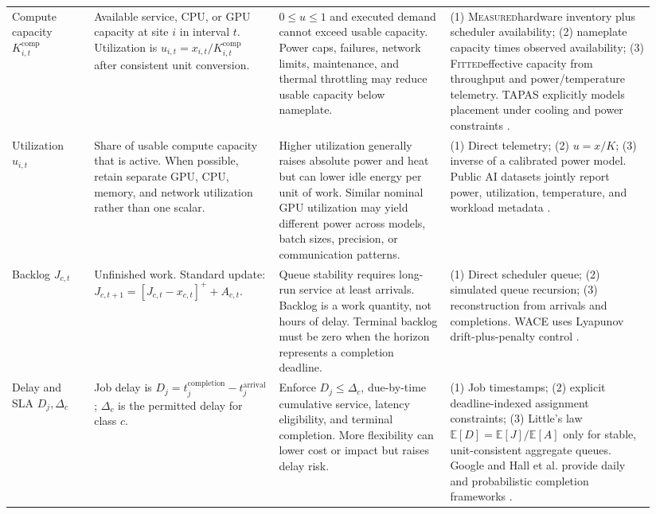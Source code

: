 \documentclass[10pt]{article}
\newcommand{\status}[1]{\textsc{#1}}
\newcommand{\Measured}{\status{Measured}}
\newcommand{\Fitted}{\status{Fitted}}
\begin{document}
\begin{landscape}
\begin{longtable}{@{}P{0.12\linewidth}P{0.27\linewidth}P{0.25\linewidth}P{0.30\linewidth}@{}}
Compute capacity $K^{\mathrm{comp}}_{i,t}$ & Available service, CPU, or GPU capacity at site $i$ in interval $t$. Utilization is $u_{i,t}=x_{i,t}/K^{\mathrm{comp}}_{i,t}$ after consistent unit conversion. & $0\le u\le1$ and executed demand cannot exceed usable capacity. Power caps, failures, network limits, maintenance, and thermal throttling may reduce usable capacity below nameplate. & (1) \Measured hardware inventory plus scheduler availability; (2) nameplate capacity times observed availability; (3) \Fitted effective capacity from throughput and power/temperature telemetry. TAPAS explicitly models placement under cooling and power constraints \cite{stojkovic2025tapas}. \\

Utilization $u_{i,t}$ & Share of usable compute capacity that is active. When possible, retain separate GPU, CPU, memory, and network utilization rather than one scalar. & Higher utilization generally raises absolute power and heat but can lower idle energy per unit of work. Similar nominal GPU utilization may yield different power across models, batch sizes, precision, or communication patterns. & (1) Direct telemetry; (2) $u=x/K$; (3) inverse of a calibrated power model. Public AI datasets jointly report power, utilization, temperature, and workload metadata \cite{nlr2026genai,elsayed2026ai}. \\

Backlog $J_{c,t}$ & Unfinished work. Standard update: $J_{c,t+1}=[J_{c,t}-x_{c,t}]^+ + A_{c,t}$. & Queue stability requires long-run service at least arrivals. Backlog is a work quantity, not hours of delay. Terminal backlog must be zero when the horizon represents a completion deadline. & (1) Direct scheduler queue; (2) simulated queue recursion; (3) reconstruction from arrivals and completions. WACE uses Lyapunov drift-plus-penalty control \cite{islam2018wace}. \\

Delay and SLA $D_j,\Delta_c$ & Job delay is $D_j=t_j^{\mathrm{completion}}-t_j^{\mathrm{arrival}}$; $\Delta_c$ is the permitted delay for class $c$. & Enforce $D_j\le\Delta_c$, due-by-time cumulative service, latency eligibility, and terminal completion. More flexibility can lower cost or impact but raises delay risk. & (1) Job timestamps; (2) explicit deadline-indexed assignment constraints; (3) Little's law $\mathbb E[D]=\mathbb E[J]/\mathbb E[A]$ only for stable, unit-consistent aggregate queues. Google and Hall et al. provide daily and probabilistic completion frameworks \cite{radovanovic2021carbon,hall2024probabilistic}. \\


\end{longtable}
\end{landscape}
\end{document}
